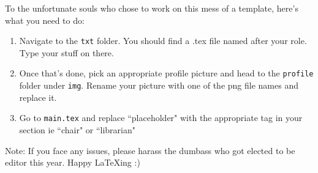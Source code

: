 To the unfortunate souls who chose to work on this mess of a template, here's what you need to do:

\begin{enumerate}
    \item Navigate to the \verb|txt| folder. You should find a .tex file named after your role. Type your stuff on there.
    \item Once that's done, pick an appropriate profile picture and head to the \verb|profile| folder under \verb|img|. Rename your picture with one of the png file names and replace it.
    \item Go to \verb|main.tex| and replace ``placeholder" with the appropriate tag in your section ie ``chair" or ``librarian"
\end{enumerate}

Note: If you face any issues, please harass the dumbass who got elected to be editor this year. Happy \LaTeX ing :)\
\clearpage